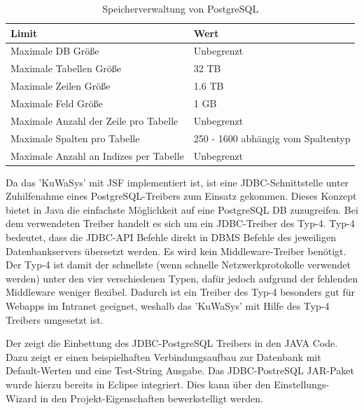 \begin{table}[H]
\begin{center}
	\begin{tabular}{|l|l|}\hline
		\textbf{Limit} & \textbf{Wert} \\ \hline	
		Maximale DB Größe & Unbegrenzt \\ \hline \hline
		Maximale Tabellen Größe & 32 TB \\ \hline \hline
		Maximale Zeilen Größe & 1.6 TB \\ \hline \hline
		Maximale Feld Größe & 1 GB \\ \hline \hline	
		Maximale Anzahl der Zeile pro Tabelle & Unbegrenzt \\ \hline \hline
		Maximale Spalten pro Tabelle &	250 - 1600 abhängig vom Spaltentyp \\ \hline \hline
		Maximale Anzahl an Indizes per Tabelle & Unbegrenzt \\ \hline \hline
	\end{tabular}
	\caption{Speicherverwaltung von PostgreSQL}
	\label{tab:PostgreSQLValues}
\end{center}
\end{table}

Da das 'KuWaSys' mit JSF implementiert ist, ist eine \gls{JDBC}-Schnittstelle unter Zuhilfenahme eines PostgreSQL-Treibers zum Einsatz gekommen. Dieses Konzept bietet in Java die einfachste Möglichkeit auf eine PostgreSQL \ac{DB} zuzugreifen. Bei dem verwendeten Treiber handelt es sich um ein JDBC-Treiber des Typ-4. 
Typ-4 bedeutet, dass die JDBC-API Befehle direkt in \ac{DBMS} Befehle des jeweiligen Datenbankservers übersetzt werden.
Es wird kein Middleware-Treiber benötigt. 
Der Typ-4 ist damit der schnellste (wenn schnelle Netzwerkprotokolle verwendet werden) unter den vier verschiedenen Typen, dafür jedoch aufgrund der fehlenden Middleware weniger flexibel.
Dadurch ist ein Treiber des Typ-4 besonders gut für Webapps im Intranet geeignet, weshalb das 'KuWaSys' mit Hilfe des Typ-4 Treibers umgesetzt ist.

Der  zeigt die Einbettung des JDBC-PostgreSQL Treibers in den JAVA Code. Dazu zeigt er einen beispielhaften Verbindungsaufbau zur Datenbank mit Default-Werten und eine Test-String Ausgabe. Das JDBC-PostreSQL \gls{JAR}-Paket wurde hierzu bereits in Eclipse integriert. Dies kann über den Einstellungs-Wizard in den Projekt-Eigenschaften bewerkstelligt werden. 

	